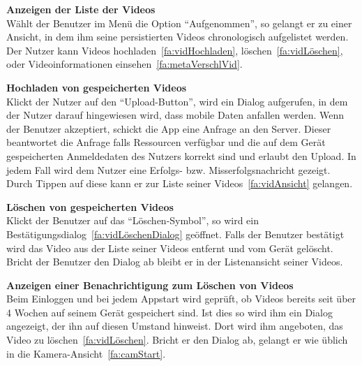 \begin{enumerate}
\begin{minipage}[t]{\linewidth}
\item \label{fa:vidAnsicht}\textbf{Anzeigen der Liste der  Videos} \hfill \\
Wählt der Benutzer im Menü die Option ``Aufgenommen'', so gelangt er zu einer Ansicht, in dem ihm seine persistierten Videos chronologisch aufgelistet werden. Der Nutzer kann Videos hochladen~\eqref{fa:vidHochladen}, löschen~\eqref{fa:vidLöschen}, oder Videoinformationen einsehen~\eqref{fa:metaVerschlVid}.
\end{minipage}

\item \label{fa:vidHochladen}\textbf{Hochladen von gespeicherten Videos} \hfill \\
Klickt der Nutzer auf den ``Upload-Button'', wird ein Dialog aufgerufen, in dem der Nutzer darauf hingewiesen wird, dass mobile Daten anfallen werden. Wenn der Benutzer akzeptiert, schickt die \gls{App} eine Anfrage an den Server. Dieser beantwortet die Anfrage falls Ressourcen verfügbar und die auf dem Gerät gespeicherten Anmeldedaten des Nutzers korrekt sind und erlaubt den Upload. In jedem Fall wird dem Nutzer eine Erfolgs- bzw. Misserfolgsnachricht gezeigt. Durch Tippen auf diese kann er zur Liste seiner Videos~\eqref{fa:vidAnsicht} gelangen.

\item \label{fa:vidLöschen}\textbf{Löschen von gespeicherten Videos} \hfill \\
Klickt der Benutzer auf das ``Löschen-Symbol'', so wird ein Bestätigungsdialog~\eqref{fa:vidLöschenDialog} geöffnet. Falls der Benutzer bestätigt wird das Video aus der Liste seiner  Videos entfernt und vom Gerät gelöscht. Bricht der Benutzer den Dialog ab bleibt er in der Listenansicht seiner Videos.

\item \label{fa:vidLöschenDialog}\textbf{Anzeigen einer Benachrichtigung zum Löschen von Videos} \hfill \\
Beim Einloggen und bei jedem Appstart wird geprüft, ob  Videos bereits seit über 4 Wochen auf seinem Gerät gespeichert sind. Ist dies so wird ihm ein Dialog angezeigt, der ihn auf diesen Umstand hinweist. Dort wird ihm angeboten, das Video zu löschen~\eqref{fa:vidLöschen}. Bricht er den Dialog ab, gelangt er wie üblich in die Kamera-Ansicht~\eqref{fa:camStart}.


\end{enumerate}
